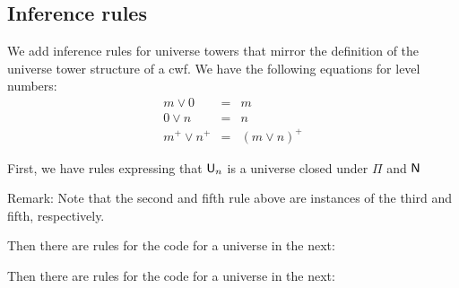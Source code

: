 \documentclass{lmcs}
\newcommand{\Ta}{\mathrm{T}}
\newcommand{\Tan}{\Ta_n}
\newcommand{\Un}{\U_n}
\begin{document}
\subsection{Inference rules}

We add inference rules for universe towers that mirror the definition of the universe tower structure of a cwf. We have the following equations for level numbers:
\begin{eqnarray*}
m \vee 0 &=&m\\
0 \vee n &=& n\\
m^+ \vee n^+ &=& (m \vee n)^+
\end{eqnarray*}

First, we have rules expressing that $\Un$ is a universe closed under $\Pi$ and $\mathsf{N}$
Remark: Note that the second and fifth rule above are instances of the third and fifth, respectively.

Then there are rules for the code for a universe in the next:

Then there are rules for the code for a universe in the next:
\end{document}
